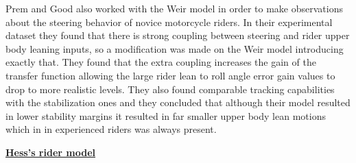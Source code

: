 \par
Prem and Good\cite{prem1984rider} also worked with the Weir model in order to make observations about the steering behavior of novice motorcycle riders. In their experimental dataset they found that there is strong coupling between steering and rider upper body leaning inputs, so a modification was made on the Weir model introducing exactly that. They found that the extra coupling increases the gain of the transfer function allowing the large rider lean to roll angle error gain values to drop to more realistic levels. They also found comparable tracking capabilities with the stabilization ones and they concluded that although their model resulted in lower stability margins it resulted in far smaller upper body lean motions which in in experienced riders was always present.

\bigbreak

\underline{\textbf{Hess’s  rider model\cite{hess2012modeling}}}
\newline


